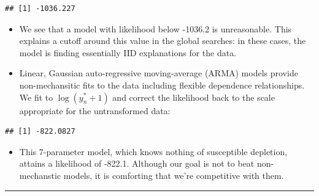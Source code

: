 \documentclass[]{article}
\newenvironment{Shaded}{\begin{snugshade}}{\end{snugshade}}
\newcommand{\KeywordTok}[1]{\textcolor[rgb]{0.13,0.29,0.53}{\textbf{#1}}}
\newcommand{\DataTypeTok}[1]{\textcolor[rgb]{0.13,0.29,0.53}{#1}}
\newcommand{\DecValTok}[1]{\textcolor[rgb]{0.00,0.00,0.81}{#1}}
\newcommand{\StringTok}[1]{\textcolor[rgb]{0.31,0.60,0.02}{#1}}
\newcommand{\OperatorTok}[1]{\textcolor[rgb]{0.81,0.36,0.00}{\textbf{#1}}}
\newcommand{\NormalTok}[1]{#1}
\providecommand{\tightlist}{%
  \setlength{\itemsep}{0pt}\setlength{\parskip}{0pt}}
\begin{document}
\begin{verbatim}
## [1] -1036.227
\end{verbatim}

\begin{itemize}
\item
  We see that a model with likelihood below -1036.2 is unreasonable.
  This explains a cutoff around this value in the global searches: in
  these cases, the model is finding essentially IID explanations for the
  data.
\item
  Linear, Gaussian auto-regressive moving-average (ARMA) models provide
  non-mechansitic fits to the data including flexible dependence
  relationships. We fit to \(\log(y_n^*+1)\) and correct the likelihood
  back to the scale appropriate for the untransformed data:
\end{itemize}

\begin{Shaded}
\end{Shaded}

\begin{verbatim}
## [1] -822.0827
\end{verbatim}

\begin{itemize}
\tightlist
\item
  This 7-parameter model, which knows nothing of susceptible depletion,
  attains a likelihood of -822.1. Although our goal is not to beat
  non-mechanstic models, it is comforting that we're competitive with
  them.
\end{itemize}

\begin{center}\rule{0.5\linewidth}{\linethickness}\end{center}
\end{document}
